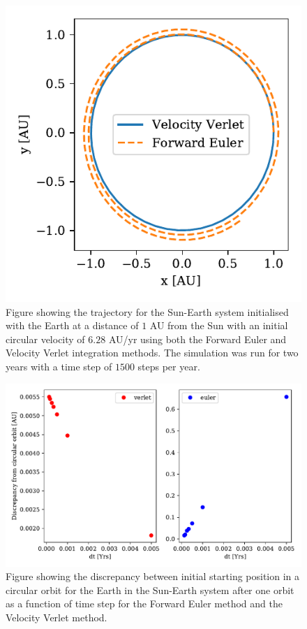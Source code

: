 \documentclass[twocolumn]{aastex62}
\begin{document}
\begin{figure}
\includegraphics[scale=1]{Figures/circularcomparison.pdf}
\caption{Figure showing the trajectory for the Sun-Earth system initialised with the Earth at a distance of $1$ AU from the Sun with an initial circular velocity of $6.28$ AU/yr using both the Forward Euler and Velocity Verlet integration methods. The simulation was run for two years with a time step of $1500$ steps per year.}
\label{fig:traj}
\end{figure}

\begin{figure}
\includegraphics[scale=1]{Figures/taskb_errors.pdf}
\caption{Figure showing the discrepancy between initial starting position in a circular orbit for the Earth in the Sun-Earth system after one orbit as a function of time step for the Forward Euler method and the Velocity Verlet method.}
\label{fig:error}
\end{figure}
\end{document}
